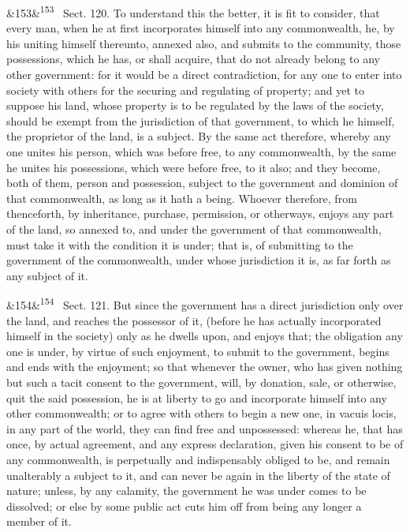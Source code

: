 \documentclass[12pt]{article}
\newcommand{\para}[1][]{\par\noindent\ifx&#1&\else\textsuperscript{\footnotesize #1}~\fi}
\begin{document}
\para[153] Sect. 120. To understand this the better, it is fit to consider, that every man, when he at first incorporates himself into any commonwealth, he, by his uniting himself thereunto, annexed also, and submits to the community, those possessions, which he has, or shall acquire, that do not already belong to any other government: for it would be a direct contradiction, for any one to enter into society with others for the securing and regulating of property; and yet to suppose his land, whose property is to be regulated by the laws of the society, should be exempt from the jurisdiction of that government, to which he himself, the proprietor of the land, is a subject. By the same act therefore, whereby any one unites his person, which was before free, to any commonwealth, by the same he unites his possessions, which were before free, to it also; and they become, both of them, person and possession, subject to the government and dominion of that commonwealth, as long as it hath a being. Whoever therefore, from thenceforth, by inheritance, purchase, permission, or otherways, enjoys any part of the land, so annexed to, and under the government of that commonwealth, must take it with the condition it is under; that is, of submitting to the government of the commonwealth, under whose jurisdiction it is, as far forth as any subject of it.

\para[154] Sect. 121. But since the government has a direct jurisdiction only over the land, and reaches the possessor of it, (before he has actually incorporated himself in the society) only as he dwells upon, and enjoys that; the obligation any one is under, by virtue of such enjoyment, to submit to the government, begins and ends with the enjoyment; so that whenever the owner, who has given nothing but such a tacit consent to the government, will, by donation, sale, or otherwise, quit the said possession, he is at liberty to go and incorporate himself into any other commonwealth; or to agree with others to begin a new one, in vacuis locis, in any part of the world, they can find free and unpossessed: whereas he, that has once, by actual agreement, and any express declaration, given his consent to be of any commonwealth, is perpetually and indispensably obliged to be, and remain unalterably a subject to it, and can never be again in the liberty of the state of nature; unless, by any calamity, the government he was under comes to be dissolved; or else by some public act cuts him off from being any longer a member of it.
\end{document}
